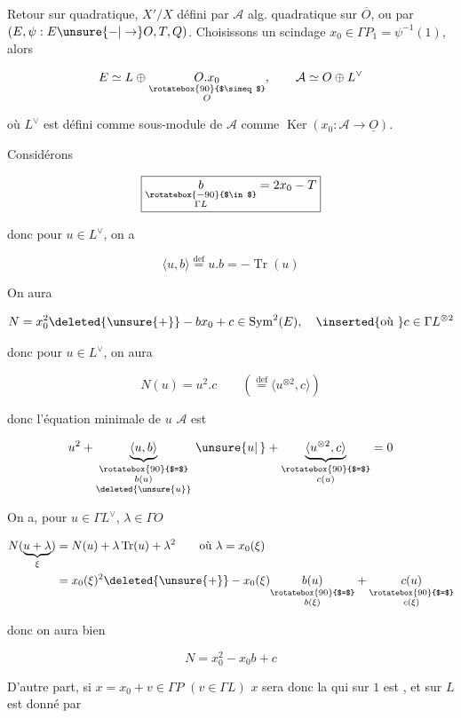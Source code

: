 

Retour sur   quadratique, $X'/X$ défini par $\mathcal{A}$ alg. quadratique sur $\overline O$, ou par $(E,\psi:E\unsure{-|\to}O,T,Q)$. Choisissons un scindage $x_0\in\Gamma P_{1}=\psi^{-1}(1)$, alors

\[ E\simeq L\oplus\underset{\substack{\rotatebox{90}{$\simeq$}\\O}}{O.x_0},\qquad \mathcal{A}\simeq O\oplus L^\vee \]

où $L^\vee$ est défini comme sous-module de $\mathcal A$  comme $\operatorname{Ker}(x_0:\mathcal{A}\to\underline O)$.

Considérons

\[ \boxed{\underset{\substack{\rotatebox{-90}{$\in$}\\\Gamma L}}{b}=2x_0-T} \]

donc pour $u\in L^\vee$, on a

\[ \langle u,b\rangle\overset{\mathrm{def}}{=}\boxed{u.b=-\operatorname{Tr}(u)} \]

On aura

\[ N=x_0^2\deleted{\unsure{+}}-bx_0+c\in\operatorname{Sym}^2(E),\quad\inserted{\text{où }}c\in\Gamma L^{\otimes2} \]

donc pour $u\in L^\vee$, on aura

\[ N(u)=u^2.c\qquad(\overset{\mathrm{def}}{=}\langle u^{\otimes2},c\rangle) \]

donc l'équation minimale de $u$  $\mathcal{A}$ est

\[ u^2+\underbrace{\langle u,b\rangle}_{\substack{\rotatebox{90}{$=$}\\ b(u)\\\deleted{\unsure{u}}}}\,\unsure{u|\,}+\underbrace{\langle u^{\otimes2},c\rangle}_{\substack{\rotatebox{90}{$=$}\\c(u)}}=0 \]


On a, pour $u\in\Gamma L^\vee$, $\lambda\in\Gamma O$

\[ \begin{aligned}N(\underbrace{u+\lambda}_{\xi})&=N(u)+\lambda\operatorname{Tr}(u)+\lambda^2\qquad\text{où }\lambda=x_0(\xi)\\ &=x_0(\xi)^2\deleted{\unsure{+}}-x_0(\xi)\underset{\substack{\rotatebox{90}{$=$}\\b(\xi)}}{b(u)}+\underset{\substack{\rotatebox{90}{$=$}\\c(\xi)}}{c(u)}\end{aligned} \]

donc on aura bien

\[ N=x_0^2-x_0 b+c \]

D'autre part, si $x=x_0+v\in\Gamma P$ \quad $(v\in\Gamma L)$  $x$ sera donc la    qui sur $1$ est , et sur $L$  est donné par
